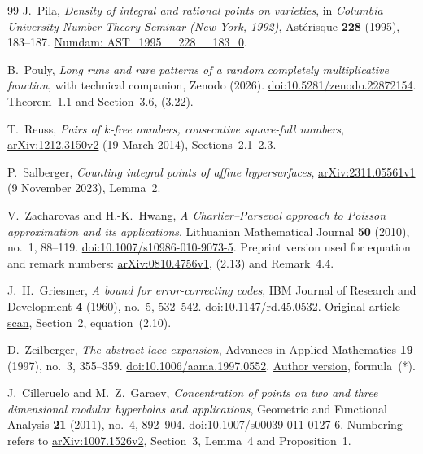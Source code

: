 \begin{thebibliography}{99}
J.~Pila,
\emph{Density of integral and rational points on varieties},
in \emph{Columbia University Number Theory Seminar
(New York, 1992)}, Ast\'erisque \textbf{228} (1995),
183--187.
\href{https://www.numdam.org/item/AST_1995__228__183_0/}
{Numdam: AST\_1995\_\_228\_\_183\_0}.

B.~Pouly,
\emph{Long runs and rare patterns of a random completely
multiplicative function}, with technical companion,
Zenodo (2026).
\href{https://doi.org/10.5281/zenodo.22872154}
{doi:10.5281/zenodo.22872154}.
Theorem~1.1 and Section~3.6, (3.22).

T.~Reuss,
\emph{Pairs of \(k\)-free numbers, consecutive square-full
numbers},
\href{https://arxiv.org/abs/1212.3150v2}
{arXiv:1212.3150v2} (19 March 2014), Sections~2.1--2.3.

P.~Salberger,
\emph{Counting integral points of affine hypersurfaces},
\href{https://arxiv.org/abs/2311.05561v1}
{arXiv:2311.05561v1} (9 November 2023), Lemma~2.

V.~Zacharovas and H.-K.~Hwang,
\emph{A Charlier--Parseval approach to Poisson approximation
and its applications},
Lithuanian Mathematical Journal \textbf{50} (2010), no.~1,
88--119.
\href{https://doi.org/10.1007/s10986-010-9073-5}
{doi:10.1007/s10986-010-9073-5}.
Preprint version used for equation and remark numbers:
\href{https://arxiv.org/abs/0810.4756v1}
{arXiv:0810.4756v1}, (2.13) and Remark~4.4.

J.~H.~Griesmer,
\emph{A bound for error-correcting codes},
IBM Journal of Research and Development \textbf{4} (1960),
no.~5, 532--542.
\href{https://doi.org/10.1147/rd.45.0532}
{doi:10.1147/rd.45.0532}.
\href{https://bitsavers.trailing-edge.com/pdf/ibm/IBM_Journal_of_Research_and_Development/045/ibmrd0405M.pdf}
{Original article scan}, Section~2, equation~(2.10).

D.~Zeilberger,
\emph{The abstract lace expansion},
Advances in Applied Mathematics \textbf{19} (1997),
no.~3, 355--359.
\href{https://doi.org/10.1006/aama.1997.0552}
{doi:10.1006/aama.1997.0552}.
\href{https://sites.math.rutgers.edu/~zeilberg/mamarim/mamarimPDF/lace.pdf}
{Author version}, formula~(*).

J.~Cilleruelo and M.~Z.~Garaev,
\emph{Concentration of points on two and three dimensional
modular hyperbolas and applications},
Geometric and Functional Analysis \textbf{21} (2011),
no.~4, 892--904.
\href{https://doi.org/10.1007/s00039-011-0127-6}
{doi:10.1007/s00039-011-0127-6}.
Numbering refers to
\href{https://arxiv.org/abs/1007.1526v2}{arXiv:1007.1526v2},
Section~3, Lemma~4 and Proposition~1.


\end{thebibliography}
